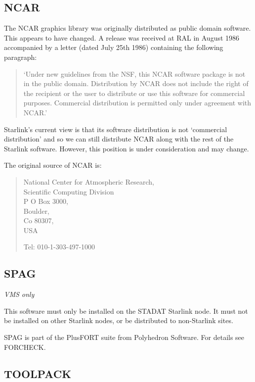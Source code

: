 \subsection {NCAR}

The NCAR graphics library was originally distributed as public domain software.
This appears to have changed.
A release was received at RAL in August 1986 accompanied by a letter (dated
July 25th 1986) containing the following paragraph:

\begin{quote}
`Under new guidelines from the NSF, this NCAR software package is not in the
public domain. Distribution by NCAR does not include the right of the recipient
or the user to distribute or use this software for commercial purposes.
Commercial distribution is permitted only under agreement with NCAR.'
\end{quote}

Starlink's current view is that its software distribution is not `commercial
distribution' and so we can still distribute NCAR along with the rest of the
Starlink software. However, this position is under consideration and may
change.

The original source of NCAR is:
\begin{verse}
National Center for Atmospheric Research,\\
Scientific Computing Division\\
P O Box 3000,\\
Boulder,\\
Co 80307,\\
USA

Tel: 010-1-303-497-1000
\end{verse}

\subsection {SPAG}

{\em VMS only}

This software must only be installed on the STADAT Starlink node.
It must not be installed on other Starlink nodes, or be distributed to
non-Starlink sites.

SPAG is part of the PlusFORT suite from Polyhedron Software. For details see
FORCHECK.

\subsection {TOOLPACK}

